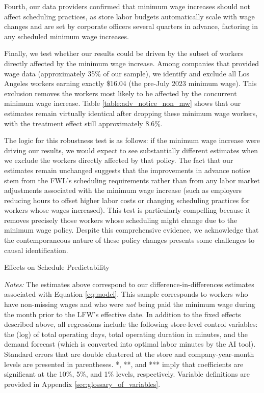 \documentclass[letterpaper,11pt,leqno]{article}
\theoremstyle{paper}
\newcommand{\note}[2][]{\parbox{\textwidth}{\footnotesize\vspace*{10pt}\textit{#1}#2}}
\begin{document}
Fourth, our data providers confirmed that minimum wage increases should not affect scheduling practices, as store labor budgets automatically scale with wage changes and are set by corporate officers several quarters in advance, factoring in any scheduled minimum wage increases.

Finally, we test whether our results could be driven by the subset of workers directly affected by the minimum wage increase. Among companies that provided wage data (approximately 35\% of our sample), we identify and exclude all Los Angeles workers earning exactly \$16.04 (the pre-July 2023 minimum wage). This exclusion removes the workers most likely to be affected by the concurrent minimum wage increase. Table \ref{table:adv_notice_non_mw} shows that our estimates remain virtually identical after dropping these minimum wage workers, with the treatment effect still approximately 8.6\%. 

The logic for this robustness test is as follows: if the minimum wage increase were driving our results, we would expect to see substantially different estimates when we exclude the workers directly affected by that policy. The fact that our estimates remain unchanged suggests that the improvements in advance notice stem from the FWL's scheduling requirements rather than from any labor market adjustments associated with the minimum wage increase (such as employers reducing hours to offset higher labor costs or changing scheduling practices for workers whose wages increased). This test is particularly compelling because it removes precisely those workers whose scheduling might change due to the minimum wage policy. Despite this comprehensive evidence, we acknowledge that the contemporaneous nature of these policy changes presents some challenges to causal identification.

\begin{singlespace}
\begin{table}[h]
\caption{Effects on Schedule Predictability}

\note{ \scriptsize \textit{Notes: } The estimates above correspond to our difference-in-differences estimates associated with Equation \ref{eq:model}. This sample corresponds to workers who have non-missing wages and who were \textit{not} being paid the minimum wage during the month prior to the LFW's effective date. In addition to the fixed effects described above, all regressions include the following store-level control variables: the (log) of total operating days, total operating duration in minutes, and the demand forecast (which is converted into optimal labor minutes by the AI tool). Standard errors that are double clustered at the store and company-year-month levels are presented in parentheses. *, **, and *** imply that coefficients are significant at the 10\%, 5\%, and 1\% levels, respectively. Variable definitions are provided in Appendix \ref{sec:glossary_of_variables}.}
\label{table:adv_notice_non_mw}
\end{table}
\end{singlespace}
\end{document}
